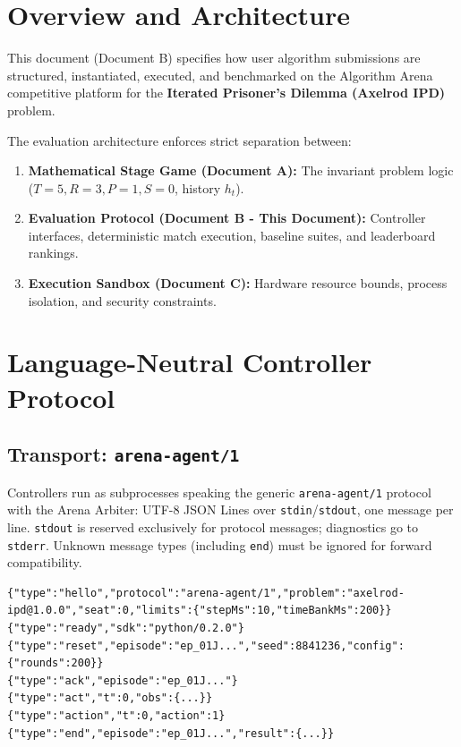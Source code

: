 \documentclass[11pt,a4paper]{article}
\begin{document}

\section{Overview and Architecture}

This document (Document B) specifies how user algorithm submissions are structured, instantiated, executed, and benchmarked on the Algorithm Arena competitive platform for the \textbf{Iterated Prisoner's Dilemma (Axelrod IPD)} problem.

The evaluation architecture enforces strict separation between:
\begin{enumerate}
    \item \textbf{Mathematical Stage Game (Document A):} The invariant problem logic ($T=5, R=3, P=1, S=0$, history $h_t$).
    \item \textbf{Evaluation Protocol (Document B - This Document):} Controller interfaces, deterministic match execution, baseline suites, and leaderboard rankings.
    \item \textbf{Execution Sandbox (Document C):} Hardware resource bounds, process isolation, and security constraints.
\end{enumerate}


\section{Language-Neutral Controller Protocol}

\subsection{Transport: \texttt{arena-agent/1}}
Controllers run as subprocesses speaking the generic \texttt{arena-agent/1}
protocol with the Arena Arbiter: UTF-8 JSON Lines over \texttt{stdin}/\texttt{stdout},
one message per line. \texttt{stdout} is reserved exclusively for protocol
messages; diagnostics go to \texttt{stderr}. Unknown message types (including
\texttt{end}) must be ignored for forward compatibility.

\begin{lstlisting}
{"type":"hello","protocol":"arena-agent/1","problem":"axelrod-ipd@1.0.0","seat":0,"limits":{"stepMs":10,"timeBankMs":200}}
{"type":"ready","sdk":"python/0.2.0"}
{"type":"reset","episode":"ep_01J...","seed":8841236,"config":{"rounds":200}}
{"type":"ack","episode":"ep_01J..."}
{"type":"act","t":0,"obs":{...}}
{"type":"action","t":0,"action":1}
{"type":"end","episode":"ep_01J...","result":{...}}
\end{lstlisting}
\end{document}
